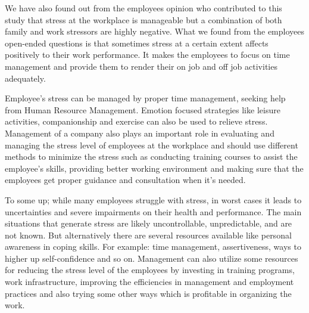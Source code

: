 We have also found out from the employees opinion who contributed to this study that stress 
at  the  workplace  is  manageable  but  a  combination  of  both  family  and  work  stressors  are 
highly negative. What we found from the employees open-ended questions is that sometimes 
stress at a certain extent affects positively to their work performance. It makes the employees 
to focus on time management and provide them to render their on job and off job activities 
adequately.  
 
Employee’s stress can be managed by proper time management, seeking help from Human 
Resource Management. Emotion focused strategies like leisure activities, companionship and 
exercise can also be used to relieve stress. Management of a company  also plays an important role in evaluating and managing the stress level of employees at the workplace and should  
use different methods to minimize the stress such as conducting training courses to assist the 
employee’s skills, providing better working environment and making sure that the employees 
get proper guidance and consultation when it’s needed.  
 
To  some  up;  while  many  employees  struggle  with  stress,  in  worst  cases  it  leads  to 
uncertainties and severe impairments  on their health and performance.  The main situations 
that  generate  stress  are  likely  uncontrollable,  unpredictable,  and  are  not  known.  But 
alternatively there are several resources available like personal awareness in coping skills. For 
example:  time  management,  assertiveness,  ways  to  higher  up  self-confidence  and  so  on. 
Management can also utilize some resources for reducing the stress level of the employees by 
investing in training programs, work infrastructure, improving the efficiencies in management 
and employment practices and also trying some other ways which is profitable in organizing 
the work. 


